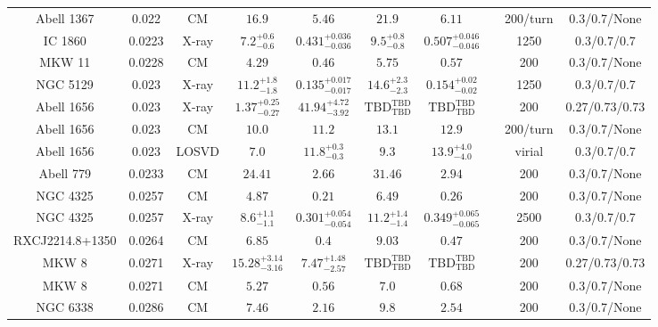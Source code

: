 \begin{table}
\begin{tabular}{cccccccccc}
Abell 1367 & 0.022 & CM & ${16.9}^{}_{}$ & ${5.46}^{}_{}$ & ${21.9}^{}_{}$ & ${6.11}^{}_{}$ & \citet{RI03.1} & 200/turn & 0.3/0.7/None \\
IC 1860 & 0.0223 & X-ray & ${7.2}^{+0.6}_{-0.6}$ & ${0.431}^{+0.036}_{-0.036}$ & ${9.5}^{+0.8}_{-0.8}$ & ${0.507}^{+0.046}_{-0.046}$ & \citet{GA06.1} & 1250 & 0.3/0.7/0.7 \\
MKW 11 & 0.0228 & CM & ${4.29}^{}_{}$ & ${0.46}^{}_{}$ & ${5.75}^{}_{}$ & ${0.57}^{}_{}$ & \citet{RI06.1} & 200 & 0.3/0.7/None \\
NGC 5129 & 0.023 & X-ray & ${11.2}^{+1.8}_{-1.8}$ & ${0.135}^{+0.017}_{-0.017}$ & ${14.6}^{+2.3}_{-2.3}$ & ${0.154}^{+0.02}_{-0.02}$ & \citet{GA06.1} & 1250 & 0.3/0.7/0.7 \\
Abell 1656 & 0.023 & X-ray & ${1.37}^{+0.25}_{-0.27}$ & ${41.94}^{+4.72}_{-3.92}$ & ${\mathrm{TBD}}^{\mathrm{TBD}}_{\mathrm{TBD}}$ & ${\mathrm{TBD}}^{\mathrm{TBD}}_{\mathrm{TBD}}$ & \citet{BA14.1} & 200 & 0.27/0.73/0.73 \\
Abell 1656 & 0.023 & CM & ${10.0}^{}_{}$ & ${11.2}^{}_{}$ & ${13.1}^{}_{}$ & ${12.9}^{}_{}$ & \citet{RI03.1} & 200/turn & 0.3/0.7/None \\
Abell 1656 & 0.023 & LOSVD & ${7.0}^{}_{}$ & ${11.8}^{+0.3}_{-0.3}$ & ${9.3}^{}_{}$ & ${13.9}^{+4.0}_{-4.0}$ & \citet{LO03.1} & virial & 0.3/0.7/0.7 \\
Abell 779 & 0.0233 & CM & ${24.41}^{}_{}$ & ${2.66}^{}_{}$ & ${31.46}^{}_{}$ & ${2.94}^{}_{}$ & \citet{RI06.1} & 200 & 0.3/0.7/None \\
NGC 4325 & 0.0257 & CM & ${4.87}^{}_{}$ & ${0.21}^{}_{}$ & ${6.49}^{}_{}$ & ${0.26}^{}_{}$ & \citet{RI06.1} & 200 & 0.3/0.7/None \\
NGC 4325 & 0.0257 & X-ray & ${8.6}^{+1.1}_{-1.1}$ & ${0.301}^{+0.054}_{-0.054}$ & ${11.2}^{+1.4}_{-1.4}$ & ${0.349}^{+0.065}_{-0.065}$ & \citet{GA06.1} & 2500 & 0.3/0.7/0.7 \\
RXCJ2214.8+1350 & 0.0264 & CM & ${6.85}^{}_{}$ & ${0.4}^{}_{}$ & ${9.03}^{}_{}$ & ${0.47}^{}_{}$ & \citet{RI06.1} & 200 & 0.3/0.7/None \\
MKW 8 & 0.0271 & X-ray & ${15.28}^{+3.14}_{-3.16}$ & ${7.47}^{+1.48}_{-2.57}$ & ${\mathrm{TBD}}^{\mathrm{TBD}}_{\mathrm{TBD}}$ & ${\mathrm{TBD}}^{\mathrm{TBD}}_{\mathrm{TBD}}$ & \citet{BA14.1} & 200 & 0.27/0.73/0.73 \\
MKW 8 & 0.0271 & CM & ${5.27}^{}_{}$ & ${0.56}^{}_{}$ & ${7.0}^{}_{}$ & ${0.68}^{}_{}$ & \citet{RI06.1} & 200 & 0.3/0.7/None \\
NGC 6338 & 0.0286 & CM & ${7.46}^{}_{}$ & ${2.16}^{}_{}$ & ${9.8}^{}_{}$ & ${2.54}^{}_{}$ & \citet{RI06.1} & 200 & 0.3/0.7/None \\

\end{tabular}
\end{table}
